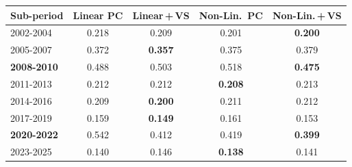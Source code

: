 \begin{tabular}{lcccc}
\toprule
Sub-period & Linear PC & Linear\,+\,VS & Non-Lin.\ PC & Non-Lin.\,+\,VS \\
\midrule
2002-2004 & 0.218 & 0.209 & 0.201 & \textbf{0.200} \\
2005-2007 & 0.372 & \textbf{0.357} & 0.375 & 0.379 \\
\textbf{2008-2010} & 0.488 & 0.503 & 0.518 & \textbf{0.475} \\
2011-2013 & 0.212 & 0.212 & \textbf{0.208} & 0.213 \\
2014-2016 & 0.209 & \textbf{0.200} & 0.211 & 0.212 \\
2017-2019 & 0.159 & \textbf{0.149} & 0.161 & 0.153 \\
\textbf{2020-2022} & 0.542 & 0.412 & 0.419 & \textbf{0.399} \\
2023-2025 & 0.140 & 0.146 & \textbf{0.138} & 0.141 \\
\bottomrule
\end{tabular}
